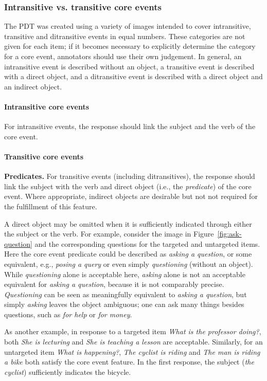 \documentclass[12pt,notitlepage]{article}
\begin{document}
\subsubsection{Intransitive vs. transitive core events} The PDT was created using a variety of images intended to cover intransitive, transitive and ditransitive events in equal numbers. These categories are not given for each item; if it becomes necessary to explicitly determine the category for a core event, annotators should use their own judgement. In general, an intransitive event is described without an object, a transitive event is described with a direct object, and a ditransitive event is described with a direct object and an indirect object.

\paragraph{Intransitive core events} For intransitive events, the response should link the subject and the verb of the core event.

\paragraph{Transitive core events} \textbf{Predicates.} For transitive events (including ditransitives), the response should link the subject with the verb and direct object (i.e., the \textit{predicate}) of the core event. Where appropriate, indirect objects are desirable but not not required for the fulfillment of this feature. 

A direct object may be omitted when it is sufficiently indicated through either the subject or the verb. For example, consider the image in Figure~\ref{fig:ask-question} and the corresponding questions for the targeted and untargeted items. Here the core event predicate could be described as \textit{asking a question}, or some equivalent, e.g., \textit{posing a query} or even simply \textit{questioning} (without an object). While \textit{questioning} alone is acceptable here,
 \textit{asking} alone is not an acceptable equivalent for \textit{asking a question}, because it is not comparably precise. \textit{Questioning} can be seen as meaningfully equivalent to \textit{asking a question}, but simply \textit{asking} leaves the object ambiguous; one can ask many things besides questions, such as \textit{for help} or \textit{for money}.

As another example, in response to a targeted item \textit{What is the professor doing?}, both \textit{She is lecturing} and \textit{She is teaching a lesson} are acceptable. Similarly, for an untargeted item \textit{What is happening?}, \textit{The cyclist is riding} and \textit{The man is riding a bike} both satisfy the core event feature. In the first response, the subject (\textit{the cyclist}) sufficiently indicates the bicycle.
\end{document}
